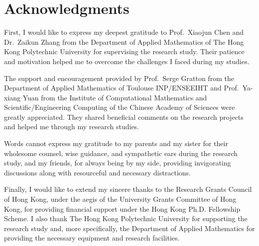 %
%
%
\chapter*{Acknowledgments}
\label{ch:acknowledgments}

First, I would like to express my deepest gratitude to Prof.\ Xiaojun Chen and Dr.\ Zaikun Zhang from the Department of Applied Mathematics of The Hong Kong Polytechnic University for supervising the research study.
Their patience and motivation helped me to overcome the challenges I faced during my studies.

The support and encouragement provided by Prof.\ Serge Gratton from the Department of Applied Mathematics of Toulouse INP/ENSEEIHT and Prof.\ Ya-xiang Yuan from the Institute of Computational Mathematics and Scientific/Engineering Computing of the Chinese Academy of Sciences were greatly appreciated.
They shared beneficial comments on the research projects and helped me through my research studies.

Words cannot express my gratitude to my parents and my sister for their wholesome counsel, wise guidance, and sympathetic ears during the research study, and my friends, for always being by my side, providing invigorating discussions along with resourceful and necessary distractions.

Finally, I would like to extend my sincere thanks to the Research Grants Council of Hong Kong, under the aegis of the University Grants Committee of Hong Kong, for providing financial support under the Hong Kong Ph.D. Fellowship Scheme.
I also thank The Hong Kong Polytechnic University for supporting the research study and, more specifically, the Department of Applied Mathematics for providing the necessary equipment and research facilities.
